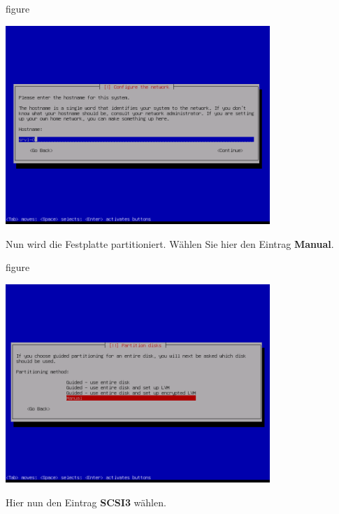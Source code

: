 \begin{nofloat}{figure}
\begin{center}
\includegraphics[width=0.75\textwidth]{screenshots/10_ubuntu_install.png}
\end{center}
\end{nofloat}
\newpage
Nun wird die Festplatte partitioniert. Wählen Sie hier den Eintrag
\textbf{Manual}.

\begin{nofloat}{figure}
\begin{center}
\includegraphics[width=0.75\textwidth]{screenshots/11_ubuntu_install.png}
\end{center}
\end{nofloat}

Hier nun den Eintrag \textbf{SCSI3} wählen.

